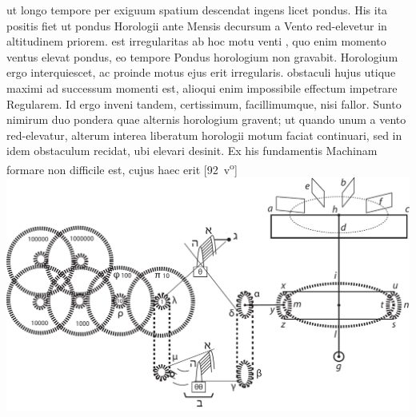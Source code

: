 ut longo tempore per exiguum spatium descendat ingens licet pondus.
\pend
\pstart
His ita positis fiet ut pondus\protect{} Horologii\protect{} ante Mensis decursum a Vento\protect{} red-elevetur in altitudinem priorem.\textso{
}
\pend
\pstart
{}est irregularitas ab hoc motu venti
,
quo enim momento ventus\protect{} elevat pondus,\protect{}
eo tempore Pondus horologium non gravabit.
Horologium\protect{} ergo interquiescet,
ac proinde motus ejus erit irregularis.
\pend
\pstart
{}obstaculi hujus utique maximi ad successum momenti est,
alioqui enim impossibile
effectum impetrare Regularem.
Id ergo inveni tandem, certissimum, facillimumque, nisi fallor.
Sunto nimirum duo pondera\protect{}
quae alternis horologium\protect{} gravent;
ut quando unum a vento\protect{} red-elevatur, alterum interea liberatum
horologii motum faciat continuari,
sed in idem obstaculum recidat,
ubi 
elevari desinit.
\pend
\pstart
Ex his fundamentis Machinam\protect{} formare non difficile est,
cujus haec erit
[92~v\textsuperscript{o}]
\pend
\newpage
\count{}
\pstart
\noindent
    \includegraphics[width=1.0\textwidth]{images/LH037,05_092v-d1.pdf}\\
